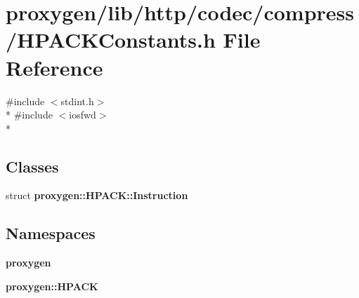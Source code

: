 \section{proxygen/lib/http/codec/compress/\+H\+P\+A\+C\+K\+Constants.h File Reference}
\label{HPACKConstants_8h}
{\ttfamily \#include $<$stdint.\+h$>$}\\*
{\ttfamily \#include $<$iosfwd$>$}\\*
\subsection*{Classes}
\begin{DoxyCompactItemize}
\item 
struct {\bf proxygen\+::\+H\+P\+A\+C\+K\+::\+Instruction}
\end{DoxyCompactItemize}
\subsection*{Namespaces}
\begin{DoxyCompactItemize}
\item 
 {\bf proxygen}
\item 
 {\bf proxygen\+::\+H\+P\+A\+CK}
\end{DoxyCompactItemize}
